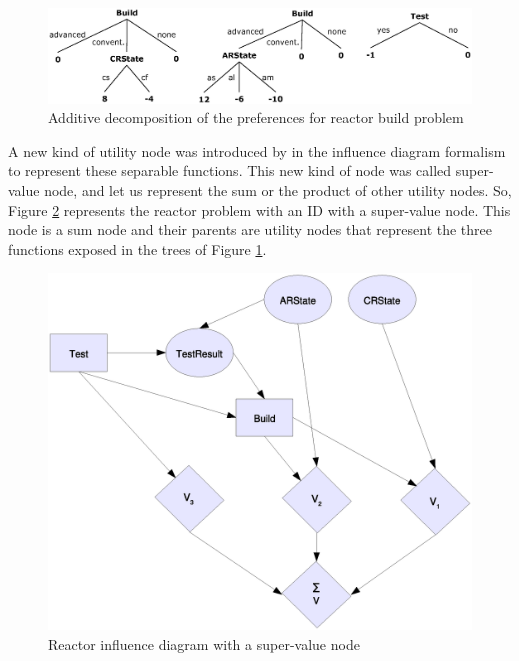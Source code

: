 \begin{figure}[h]
\begin{center}
\includegraphics[scale=0.5]{./ID/fig/prefTreeSV} \vspace{-0.5cm}
\end{center}
\caption{Additive decomposition of the preferences for reactor build problem}
\label{prefTreeSV}
\end{figure}

A new kind of utility node was introduced by \cite{tatman90} in the
influence diagram formalism to represent these separable functions.
This new kind of node was called super-value node, and let us
represent the sum or the product of other utility nodes. So, Figure
\ref{reactorIDSV} represents the reactor problem with an ID with a
super-value node. This node is a sum node and their parents are
utility nodes that represent the three functions exposed in the
trees of Figure \ref{prefTreeSV}.

\begin{figure}[h]
\begin{center}
\includegraphics[scale=0.4]{./ID/fig/reactorIDSV} \vspace{-0.5cm}
\end{center}
\caption{Reactor influence diagram with a super-value node}
\label{reactorIDSV}
\end{figure}

